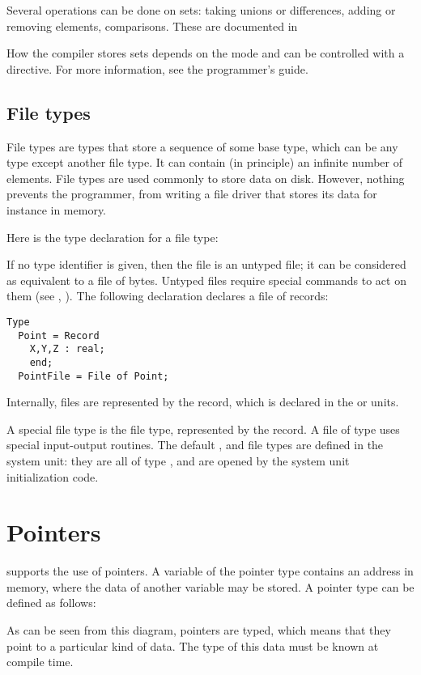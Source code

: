 Several operations can be done on sets: taking unions or differences, adding
or removing elements, comparisons. These are documented in

How the compiler stores sets depends on the mode and can be controlled with
a directive. For more information, see the programmer's guide.


%
%
\subsection{File types}
File types are types that store a sequence of some base type, which can be
any type except another file type. It can contain (in principle) an infinite
number of elements.
File types are used commonly to store data on disk. However, nothing prevents the programmer,
from writing a file driver that stores its data for instance in memory.

Here is the type declaration for a file type:

If no type identifier is given, then the file is an untyped file; it can be
considered as equivalent to a file of bytes. Untyped files require special
commands to act on them (see , ).
The following declaration declares a file of records:
\begin{verbatim}
Type
  Point = Record
    X,Y,Z : real;
    end;
  PointFile = File of Point;
\end{verbatim}
Internally, files are represented by the  record, which is
declared in the  or  units.

A special file type is the  file type, represented by the
 record. A file of type  uses special input-output
routines. The default ,  and  file
types are defined in the system unit: they are all of type , and
are opened by the system unit initialization code.

\section{Pointers}
\fpc supports the use of pointers. A variable of the pointer type
contains an address in memory, where the data of another variable may be
stored. A pointer type can be defined as follows:

As can be seen from this diagram, pointers are typed, which means that
they point to a particular kind of data. The type of this data must be
known at compile time.

